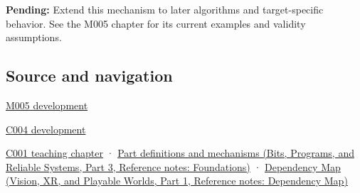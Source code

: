 \textbf{Pending:} Extend this mechanism to later algorithms and target-specific behavior. See the M005 chapter for its current examples and validity assumptions.

\subsection{Source and navigation}\label{appendix-343615f49ddf-source-and-navigation}

\hypertarget{appendix-343615f49ddf-source-and-navigation}{}

\hyperref[01-foundations-i-ch001-when-arithmetic-meets-uncertainty]{M005 development}

\hyperref[01-foundations-i-ch001-a-stretching-ruler-for-real-valued-quantities]{C004 development}

\hyperref[01-foundations-i-ch001-from-a-signal-to-an-interpretation]{C001 teaching chapter} · \href{../01-Bits-Programs-and-Reliable-Systems-P03/main.pdf\#appendix-fd090d982a15}{Part definitions and mechanisms (Bits, Programs, and Reliable Systems, Part 3, Reference notes: Foundations)} · \href{../07-Vision-XR-and-Playable-Worlds-P01/main.pdf\#appendix-4ad47bdd269a}{Dependency Map (Vision, XR, and Playable Worlds, Part 1, Reference notes: Dependency Map)}

